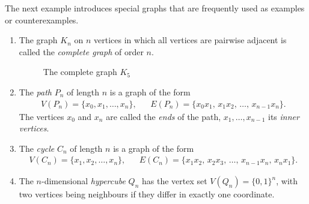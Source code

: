 The next example introduces special graphs that are frequently used as examples or counterexamples.
\begin{example} \label{ex:special_graphs}
    \begin{enumerate}
        \item[(a)] The graph $K_n$ on $n$ vertices in which all vertices are pairwise adjacent is called the \textit{complete graph} of order $n$.

        \begin{figure}[H]
            \centering
    
            \caption{The complete graph $K_5$}
            \label{fig:complete-graph}
        \end{figure}

        \item[(b)] The \textit{path} $P_n$ of length $n$ is a graph of the form 
        \begin{align*}
            V(P_n) = \{x_0, x_1, \dots, x_n\}, && E(P_n) = \{x_0 x_1,\, x_1 x_2,\, \dots,\, x_{n - 1} x_n\} .
        \end{align*}
        The vertices $x_0$ and $x_n$ are called the \textit{ends} of the path, $x_1, \dots, x_{n - 1}$ its \textit{inner vertices}. 

        \item[(c)] The \textit{cycle} $C_n$ of length $n$ is a graph of the form
        \begin{align*}
            V(C_n) = \{x_1, x_2, \dots, x_n\}, && E(C_n) = \{x_1 x_2,\, x_2 x_3,\, \dots,\, x_{n - 1} x_n,\, x_n x_1\} .
        \end{align*}

        \item[(d)] The $n$-dimensional \textit{hypercube} $Q_n$ has the vertex set $V(Q_n) = \{ 0, 1 \}^n$, with two vertices being neighbours if they differ in exactly one coordinate.
        
    \end{enumerate}
\end{example}

